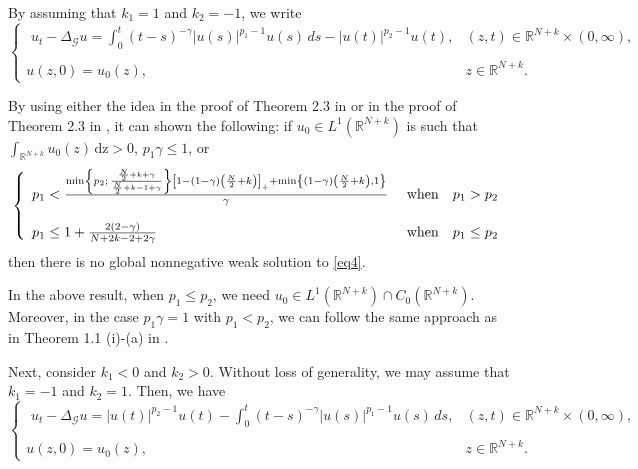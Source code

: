 \documentclass[reqno,11pt]{amsart}
\numberwithin{equation}{section}
\def\R{{\mathbb {R}}}
\def\R{\mathbb{R}}
\begin{document}
By assuming that $k_1=1$ and $k_2=-1$, we write
\begin{equation}\label{eq4}
	\left\{\begin{array}{ll}
		\,\, \displaystyle {u_{t}-\Delta_{\mathcal{G}}
			u =\int_0^t(t-s)^{-\gamma}|u(s)|^{p_1-1}u(s)\,ds-|u(t)|^{p_2-1}u(t),} &\displaystyle {(z,t)\in {\mathbb{R}}^{N+k}\times (0,\infty),}\\
		{}\\
		\displaystyle{u(z,0)=  u_0(z),\qquad\qquad}&\displaystyle{z\in {\mathbb{R}}^{N+k}.}
	\end{array}
	\right.
\end{equation} 


By using either the idea in the proof of Theorem 2.3 in \cite{Chen-Fino-23} or in the proof of Theorem 2.3 in \cite{K-Rei-21}, it can shown the following: if $u_0\in L^1(\R^{N+k})$ is such that $\displaystyle \int_{\R^{N+k}}u_0(z)\,\mathrm{dz}>0$, $p_1\gamma\leq 1$, or
$$\left\{
\begin{array}{ll}
	p_1<\frac{\min\left\{p_2;\,\frac{\frac{N}{2}+k+\gamma}{\frac{N}{2}+k-1+\gamma}\right\}\left[1-(1-\gamma)\left(\frac{N}{2}+k\right)\right]_++\min\left\{(1-\gamma)\left(\frac{N}{2}+k\right),1\right\}}{\gamma}&\,\,\hbox{when}\quad p_1>p_2\\\\
	p_1\leq 1+\frac{2(2-\gamma)}{N+2k-2+2\gamma}&\,\,\hbox{when}\quad p_1\leq p_2\\
\end{array}
\right.
$$
then there is no global nonnegative weak solution to \eqref{eq4}. 

In the above result, when $p_1\leq p_2$, we need $u_0\in L^1(\R^{N+k})\cap C_0(\R^{N+k})$. Moreover, in the case $p_1\gamma=1$ with $p_1<p_2$, we can follow the same approach as in Theorem 1.1 (i)-(a) in \cite{Zh-23}. 







Next, consider $k_1<0$ and $k_2>0$. Without loss of generality, we may assume that $k_1=-1$ and $k_2=1$. Then, we have
\begin{equation}\label{eq5}
	\left\{\begin{array}{ll}
		\,\, \displaystyle {u_{t}-\Delta_{\mathcal{G}}
			u =|u(t)|^{p_2-1}u(t)-\int_0^t(t-s)^{-\gamma}|u(s)|^{p_1-1}u(s)\,ds,} &\displaystyle {(z,t)\in {\mathbb{R}}^{N+k}\times (0,\infty),}\\
		{}\\
		\displaystyle{u(z,0)=  u_0(z),\qquad\qquad}&\displaystyle{z\in {\mathbb{R}}^{N+k}.}
	\end{array}
	\right.
\end{equation} 
\end{document}
